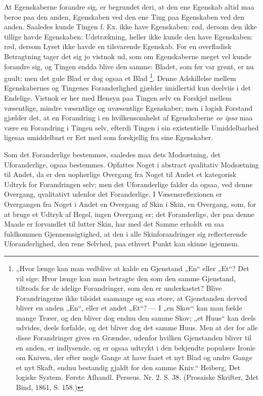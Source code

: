 \documentclass[11pt]{book}
\newcommand{\opage}[1]{\marginnote{\footnotesize\textit{[#1]}}}
\begin{document}
At Egenskaberne forandre sig, er begrundet deri, at den ene
Egenskab altid maa beroe paa den anden, Egenskaben ved den ene Ting
paa Egenskaben ved den anden. Saaledes kunde Tingen f. Ex. ikke
have Egenskaben: rød, dersom den ikke tillige havde Egenskaben:
Udstrækning, heller ikke kunde den have Egenskaben: rød, dersom
Lyset ikke havde en tilsvarende Egenskab. For en overfladisk
Betragtning tager det sig jo vistnok ud, som om Egenskaberne meget
vel kunde forandre sig, og Tingen endda blive den samme: Bladet,
som før var grønt, er nu guult; men det gule Blad er dog ogsaa et
Blad%
\footnote{„Hvor længe kan man vedblive at kalde en Gjenstand „En“
eller „Et“? Det vil sige: Hvor længe kan man betragte den som den
samme Gjenstand, tiltrods for de idelige Forandringer, som den er
underkastet? Blive Forandringerne ikke tilsidst saamange og saa
store, at Gjenstanden derved bliver en anden „En“, eller et andet
„Et“? --- I „en Skov“ kan man fælde mange Træer, og den bliver dog
endnu den samme Skov; „et Huus“ kan deels udvides, deels forfalde,
og det bliver dog det samme Huus. Men at der for alle disse
Forandringer gives en Grændse, udenfor hvilken Gjenstanden bliver
til en anden, er indlysende, og er ogsaa udtrykt i den bekjendte
populære Ironie om Kniven, der efter nogle Gange at have faaet et
nyt Blad og andre Gange et nyt Skaft, endnu bestandig gjaldt for
den samme Kniv.“ Heiberg, Det logiske System. Første Afhandl.
Perseus. Nr. 2. S. 38. (Prosaiske Skrifter, 2det Bind, 1861, S.
158.)}. Denne Adskillelse mellem Egenskabernes og Tingenes
Foranderlighed gjælder imidlertid kun deelviis i det Endelige.
Vistnok er her med Hensyn paa Tingen selv en Forskjel mellem
væsentlige, mindre væsentlige og uvæsentlige Egenskaber; men i
logisk Forstand gjælder det, at en Forandring i en hvilkensomhelst
af Egenskaberne \textit{eo ipso} maa være en Forandring i Tingen
selv, efterdi Tingen i sin existentielle Umiddelbarhed
\opage{108} \setcounter{footnote}{0}%
ligesaa umiddelbart er Eet med som forskjellig fra sine
Egenskaber.

Som det Foranderlige bestemmes, saaledes maa dets Modsætning, det
Uforanderlige, ogsaa bestemmes. Opfattes Noget i abstract
qvalitativ Modsætning til Andet, da er den uophørlige Overgang fra
Noget til Andet et kategorisk Udtryk for Forandringen selv; men det
Uforanderlige falder da ogsaa, ved denne Overgang, qvalitativt
udenfor det Foranderlige. I Væsensreflexionen er Overgangen fra
Noget i Andet en Overgang af Skin i Skin, en Overgang, som, for at
bruge et Udtryk af Hegel, ingen Overgang er; det Foranderlige, der
paa denne Maade er forvandlet til lutter Skin, har med det Samme
erholdt en saa fuldkommen Gjennemsigtighed, at den i alle
Skinforandringer sig reflecterende Uforanderlighed, den rene
Selvhed, paa ethvert Punkt kan skinne igjennem.
\end{document}
